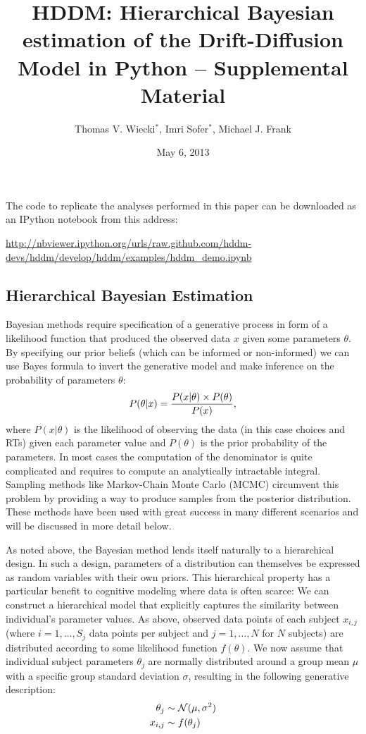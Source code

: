 \documentclass[letterpaper,10pt,english]{article}
\title{HDDM: Hierarchical Bayesian estimation of the Drift-Diffusion Model in Python -- Supplemental Material}
\date{May 6, 2013}
\author{Thomas V. Wiecki$^\ast$, Imri Sofer$^\ast$, Michael J. Frank}
\begin{document}
\maketitle

The code to replicate the analyses performed in this paper can be downloaded as an IPython notebook from this address:

\href{http://nbviewer.ipython.org/urls/raw.github.com/hddm-devs/hddm/develop/hddm/examples/hddm\_demo.ipynb}{http://nbviewer.ipython.org/urls/raw.github.com/hddm-devs/hddm/develop/hddm/examples/hddm\_demo.ipynb}

\subsection*{Hierarchical Bayesian Estimation}
Bayesian methods require specification of a generative process in form
of a likelihood function that produced the observed data $x$
given some parameters $\theta$. By specifying our prior beliefs
(which can be informed or non-informed) we can use Bayes formula to
invert the generative model and make inference on the probability of
parameters $\theta$:
\label{methods:bayes}\begin{gather}
\begin{split}P(\theta|x) = \frac{P(x|\theta) \times P(\theta)}{P(x)}\end{split}\notag,
\end{gather}
where $P(x|\theta)$ is the likelihood of observing the data (in
this case choices and RTs) given each parameter value and
$P(\theta)$ is the prior probability of the parameters. In most
cases the computation of the denominator is quite complicated and
requires to compute an analytically intractable integral. Sampling
methods like Markov-Chain Monte Carlo (MCMC) \citep{GamermanLopes06}
circumvent this problem by providing a way to produce samples from the
posterior distribution. These methods have been used with great
success in many different scenarios \citep{GelmanCarlinSternEtAl03}
and will be discussed in more detail below.

As noted above, the Bayesian method lends itself naturally to a hierarchical design. In such a design, parameters of a distribution can themselves be expressed as random variables with their own priors. This hierarchical property has a particular benefit to cognitive modeling where data is often scarce: We can construct a hierarchical model that explicitly captures the similarity between individual's parameter values. As above, observed data points of each subject $x_{i,j}$ (where $i = 1, \dots, S_j$ data points per subject and $j = 1, \dots, N$ for $N$ subjects) are distributed according to some likelihood function $f(\theta)$.  We now assume that individual subject parameters $\theta_j$ are normally distributed around a group mean $\mu$ with a specific group standard deviation $\sigma$, resulting in the following generative description:
\begin{gather}
\begin{split}
\theta_j &\sim \mathcal{N}(\mu, \sigma^2) \\
x_{i, j} &\sim f(\theta_j)\end{split}\notag
\end{gather}
\end{document}
